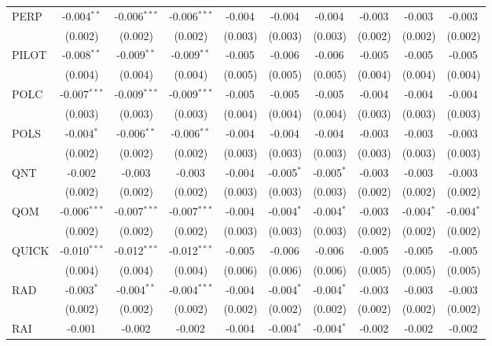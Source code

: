 \begin{table}[!htbp]
\begin{tabular}{@{\extracolsep{5pt}}lccccccccc}
 PERP & -0.004$^{**}$ & -0.006$^{***}$ & -0.006$^{***}$ & -0.004$^{}$ & -0.004$^{}$ & -0.004$^{}$ & -0.003$^{}$ & -0.003$^{}$ & -0.003$^{}$ \\
  & (0.002) & (0.002) & (0.002) & (0.003) & (0.003) & (0.003) & (0.002) & (0.002) & (0.002) \\
 PILOT & -0.008$^{**}$ & -0.009$^{**}$ & -0.009$^{**}$ & -0.005$^{}$ & -0.006$^{}$ & -0.006$^{}$ & -0.005$^{}$ & -0.005$^{}$ & -0.005$^{}$ \\
  & (0.004) & (0.004) & (0.004) & (0.005) & (0.005) & (0.005) & (0.004) & (0.004) & (0.004) \\
 POLC & -0.007$^{***}$ & -0.009$^{***}$ & -0.009$^{***}$ & -0.005$^{}$ & -0.005$^{}$ & -0.005$^{}$ & -0.004$^{}$ & -0.004$^{}$ & -0.004$^{}$ \\
  & (0.003) & (0.003) & (0.003) & (0.004) & (0.004) & (0.004) & (0.003) & (0.003) & (0.003) \\
 POLS & -0.004$^{*}$ & -0.006$^{**}$ & -0.006$^{**}$ & -0.004$^{}$ & -0.004$^{}$ & -0.004$^{}$ & -0.003$^{}$ & -0.003$^{}$ & -0.003$^{}$ \\
  & (0.002) & (0.002) & (0.002) & (0.003) & (0.003) & (0.003) & (0.003) & (0.003) & (0.003) \\
 QNT & -0.002$^{}$ & -0.003$^{}$ & -0.003$^{}$ & -0.004$^{}$ & -0.005$^{*}$ & -0.005$^{*}$ & -0.003$^{}$ & -0.003$^{}$ & -0.003$^{}$ \\
  & (0.002) & (0.002) & (0.002) & (0.003) & (0.003) & (0.003) & (0.002) & (0.002) & (0.002) \\
 QOM & -0.006$^{***}$ & -0.007$^{***}$ & -0.007$^{***}$ & -0.004$^{}$ & -0.004$^{*}$ & -0.004$^{*}$ & -0.003$^{}$ & -0.004$^{*}$ & -0.004$^{*}$ \\
  & (0.002) & (0.002) & (0.002) & (0.003) & (0.003) & (0.003) & (0.002) & (0.002) & (0.002) \\
 QUICK & -0.010$^{***}$ & -0.012$^{***}$ & -0.012$^{***}$ & -0.005$^{}$ & -0.006$^{}$ & -0.006$^{}$ & -0.005$^{}$ & -0.005$^{}$ & -0.005$^{}$ \\
  & (0.004) & (0.004) & (0.004) & (0.006) & (0.006) & (0.006) & (0.005) & (0.005) & (0.005) \\
 RAD & -0.003$^{*}$ & -0.004$^{**}$ & -0.004$^{***}$ & -0.004$^{}$ & -0.004$^{*}$ & -0.004$^{*}$ & -0.003$^{}$ & -0.003$^{}$ & -0.003$^{}$ \\
  & (0.002) & (0.002) & (0.002) & (0.002) & (0.002) & (0.002) & (0.002) & (0.002) & (0.002) \\
 RAI & -0.001$^{}$ & -0.002$^{}$ & -0.002$^{}$ & -0.004$^{}$ & -0.004$^{*}$ & -0.004$^{*}$ & -0.002$^{}$ & -0.002$^{}$ & -0.002$^{}$ \\

\end{tabular}
\end{table}
